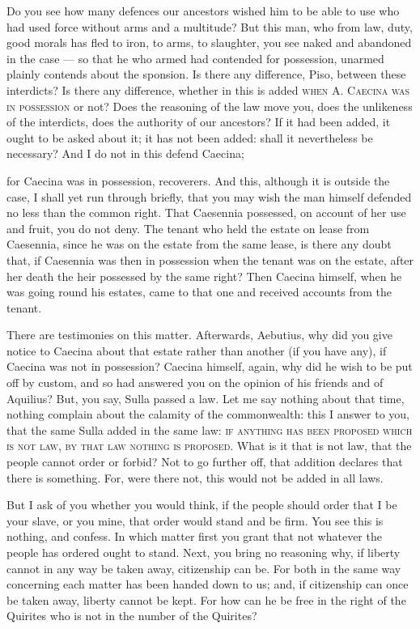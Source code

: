  Do you see how many defences our ancestors wished him to be able to use who had used force without arms and a multitude? But this man, who from law, duty, good morals has fled to iron, to arms, to slaughter, you see naked and abandoned in the case --- so that he who armed had contended for possession, unarmed plainly contends about the sponsion. Is there any difference, Piso, between these interdicts? Is there any difference, whether in this is added \textsc{when A. Caecina was in possession} or not? Does the reasoning of the law move you, does the unlikeness of the interdicts, does the authority of our ancestors? If it had been added, it ought to be asked about it; it has not been added: shall it nevertheless be necessary? And I do not in this defend Caecina;

 for Caecina was in possession, recoverers. And this, although it is outside the case, I shall yet run through briefly, that you may wish the man himself defended no less than the common right. That Caesennia possessed, on account of her use and fruit, you do not deny. The tenant who held the estate on lease from Caesennia, since he was on the estate from the same lease, is there any doubt that, if Caesennia was then in possession when the tenant was on the estate, after her death the heir possessed by the same right? Then Caecina himself, when he was going round his estates, came to that one and received accounts from the tenant.

 There are testimonies on this matter. Afterwards, Aebutius, why did you give notice to Caecina about that estate rather than another (if you have any), if Caecina was not in possession? Caecina himself, again, why did he wish to be put off by custom, and so had answered you on the opinion of his friends and of Aquilius? But, you say, Sulla passed a law. Let me say nothing about that time, nothing complain about the calamity of the commonwealth: this I answer to you, that the same Sulla added in the same law: \textsc{if anything has been proposed which is not law, by that law nothing is proposed}. What is it that is not law, that the people cannot order or forbid? Not to go further off, that addition declares that there is something. For, were there not, this would not be added in all laws.

 But I ask of you whether you would think, if the people should order that I be your slave, or you mine, that order would stand and be firm. You see this is nothing, and confess. In which matter first you grant that not whatever the people has ordered ought to stand. Next, you bring no reasoning why, if liberty cannot in any way be taken away, citizenship can be. For both in the same way concerning each matter has been handed down to us; and, if citizenship can once be taken away, liberty cannot be kept. For how can he be free in the right of the Quirites who is not in the number of the Quirites?

